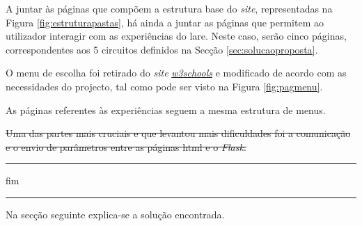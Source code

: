 A juntar às páginas que compõem a estrutura base do \textit{site}, representadas na Figura \ref{fig:estruturapastas}, há ainda a juntar as páginas que permitem ao utilizador interagir com as experiências do \acrshort{lare}. Neste caso, serão cinco páginas, correspondentes aos 5 circuitos definidos na Secção \ref{sec:solucaoproposta}.

O menu de escolha foi retirado do \textit{site} \href{https://www.w3schools.com/howto/howto_js_vertical_tabs.asp}{\textit{w3schools}} e modificado de acordo com as necessidades do projecto, tal como pode ser visto na Figura \ref{fig:pagmenu}.

As páginas referentes às experiências seguem a mesma estrutura de menus.

\sout{Uma das partes mais cruciais e que levantou mais dificuldades foi a comunicação e o envio de parâmetros entre as páginas \acrshort{html} e o \textit{Flask}.}

\hrule
fim
\hrule

Na secção seguinte explica-se a solução encontrada.
